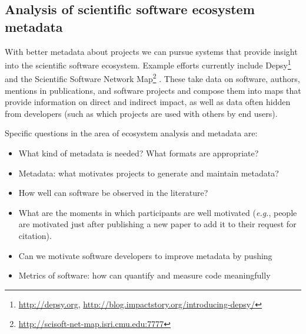 \documentclass[a4paper,UKenglish]{dagman}
\newcommand{\eg}{\emph{e.g.},\xspace}
\begin{document}
\subsection{Analysis of scientific software ecosystem metadata}

With better metadata about projects we can pursue systems that provide insight into the scientific software ecosystem.
Example efforts currently include Depsy\footnote{\url{http://depsy.org}, \url{http://blog.impactstory.org/introducing-depsy/}}
and the Scientific Software Network Map\footnote{%
\url{http://scisoft-net-map.isri.cmu.edu:7777}}
\cite{mcconahy2012techniques,howison2015understanding}.
These take data on software, authors, mentions in publications, and software projects and compose them into maps that provide information on direct and indirect impact, as well as data often hidden from developers (such as which projects are used with others by end users).

Specific questions in the area of ecosystem analysis and metadata are:

\begin{itemize}
\item What kind of metadata is needed? What formats are appropriate?
\item Metadata: what motivates projects to generate and maintain metadata?
\item How well can software be observed in the literature?
\item What are the moments in which participants are well motivated (\eg people are motivated just after publishing a new paper to add it to their request for citation).
\item Can we motivate software developers to improve metadata by pushing
\item Metrics of software: how can quantify and measure code meaningfully
\end{itemize}
\end{document}
